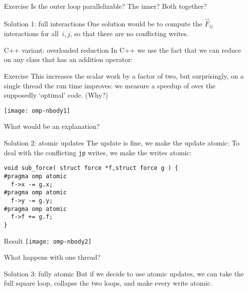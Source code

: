 \documentclass[11pt,headernav]{beamer}
\begin{document}
\begin{numberedframe}{Exercise}
  Is the outer loop parallelizable? The inner? Both together?
\end{numberedframe}

\begin{numberedframe}{Solution 1: full interactions}
One solution would be to compute the $\overrightarrow F_{ij}$
interactions for all~$i,j$,
so that there are no conflicting writes.

\end{numberedframe}

\begin{numberedframe}{C++ variant: overloaded reduction}
In C++ we use the fact that we can reduce on any class
that has an addition operator:
%
\end{numberedframe}

\begin{numberedframe}{Exercise}
This increases the scalar work by a factor of two,
but surprisingly, on a single thread the run time improves:
we measure a speedup of  over the supposedly `optimal' code.
(Why?)

\texttt{[image: omp-nbody1]}

What would be an explanation?
\end{numberedframe}

\begin{numberedframe}{Solution 2: atomic updates}
The  update is fine, we make the  update atomic:
To deal with the conflicting \lstinline{jp} writes,
we make the writes atomic:
\begin{lstlisting}
void sub_force( struct force *f,struct force g ) {
#pragma omp atomic
  f->x -= g.x;
#pragma omp atomic
  f->y -= g.y;
#pragma omp atomic
  f->f += g.f;
}
\end{lstlisting}
\end{numberedframe}

\begin{numberedframe}{Result}
  \texttt{[image: omp-nbody2]}

  What happens with one thread?
\end{numberedframe}

\begin{numberedframe}{Solution 3: fully atomic}
But if we decide to use atomic updates,
we can take the full square loop,
collapse the two loops,
and make every write atomic.
\end{numberedframe}
\end{document}
